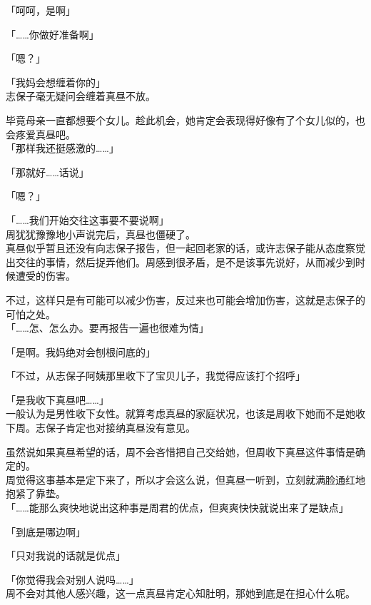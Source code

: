 「呵呵，是啊」

「……你做好准备啊」

「嗯？」

「我妈会想缠着你的」\\

志保子毫无疑问会缠着真昼不放。

毕竟母亲一直都想要个女儿。趁此机会，她肯定会表现得好像有了个女儿似的，也会疼爱真昼吧。\\

「那样我还挺感激的……」

「那就好……话说」

「嗯？」

「……我们开始交往这事要不要说啊」\\

周犹犹豫豫地小声说完后，真昼也僵硬了。\\

真昼似乎暂且还没有向志保子报告，但一起回老家的话，或许志保子能从态度察觉出交往的事情，然后捉弄他们。周感到很矛盾，是不是该事先说好，从而减少到时候遭受的伤害。

不过，这样只是有可能可以减少伤害，反过来也可能会增加伤害，这就是志保子的可怕之处。\\

「……怎、怎么办。要再报告一遍也很难为情」

「是啊。我妈绝对会刨根问底的」

「不过，从志保子阿姨那里收下了宝贝儿子，我觉得应该打个招呼」

「是我收下真昼吧……」\\

一般认为是男性收下女性。就算考虑真昼的家庭状况，也该是周收下她而不是她收下周。志保子肯定也对接纳真昼没有意见。

虽然说如果真昼希望的话，周不会吝惜把自己交给她，但周收下真昼这件事情是确定的。\\

周觉得这事基本是定下来了，所以才会这么说，但真昼一听到，立刻就满脸通红地抱紧了靠垫。\\

「……能那么爽快地说出这种事是周君的优点，但爽爽快快就说出来了是缺点」

「到底是哪边啊」

「只对我说的话就是优点」

「你觉得我会对别人说吗……」\\

周不会对其他人感兴趣，这一点真昼肯定心知肚明，那她到底是在担心什么呢。\\

